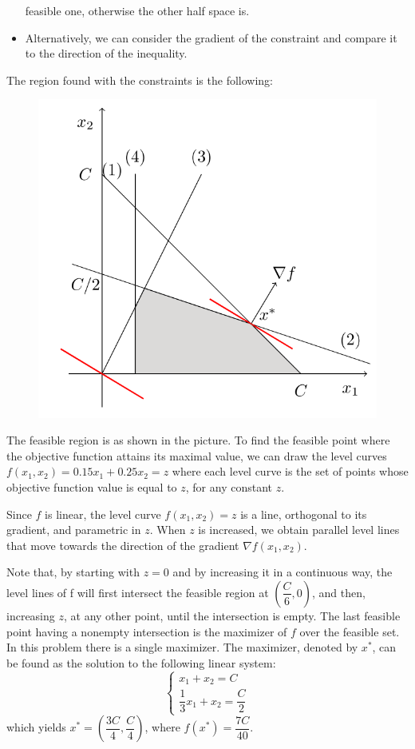 \documentclass[12pt, a4paper]{report}
\newtheorem[style=M,bodystyle=\normalfont]{theorem}{Theorem}
\newtheorem[style=M,bodystyle=\normalfont]{corollary}{Corollary}
\newtheorem[style=M,bodystyle=\normalfont]{lemma}{Lemma}
\newtheorem[style=M,bodystyle=\normalfont]{definition}{Definition}
\begin{document}
\begin{Answer}[ref=1]
\begin{itemize}
        feasible one, otherwise the other half space is.
        \item Alternatively, we can consider the gradient of the constraint and compare it to the direction of the inequality. 
    \end{itemize}
    The region found with the constraints is the following:
    \begin{figure}[H]
        \centering
        \includegraphics[width=0.5\linewidth]{images/plane.png}
    \end{figure}
    The feasible region is as shown in the picture. To find the feasible point where the objective function attains its maximal value, we can draw the level curves 
    $f(x_1,x_2)=0.15x_1+0.25x_2=z$ where each level curve is the set of points whose objective function value is equal to $z$, for any constant $z$. 
    
    Since $f$ is linear, the level curve $f(x_1,x_2) = z$ is a line, orthogonal to its gradient, and parametric in $z$. When $z$ is increased, we obtain parallel level lines that 
    move towards the direction of the gradient $\nabla f (x_1,x_2)$. 

    Note that, by starting with $z = 0$ and by increasing it in a continuous way, the level lines of f will first intersect the feasible region at $\left(\dfrac{C}{6}, 0\right)$, and then, 
    increasing $z$, at any other point, until the intersection is empty. The last feasible point having a nonempty intersection is the maximizer of $f$ over the feasible set. 
    In this problem there is a single maximizer. The maximizer, denoted by $x^{*}$, can be found as the solution to the following linear system: 
    \[
    \begin{cases}
        x_1+x_2 = C \\
        \dfrac{1}{3}x_1+x_2 = \dfrac{C}{2}
    \end{cases} 
    \]
    which yields $x^{*}=\left( \dfrac{3C}{4},\dfrac{C}{4} \right)$, where $f(x^{*})=\dfrac{7C}{40}$.
\end{Answer}
\end{document}

